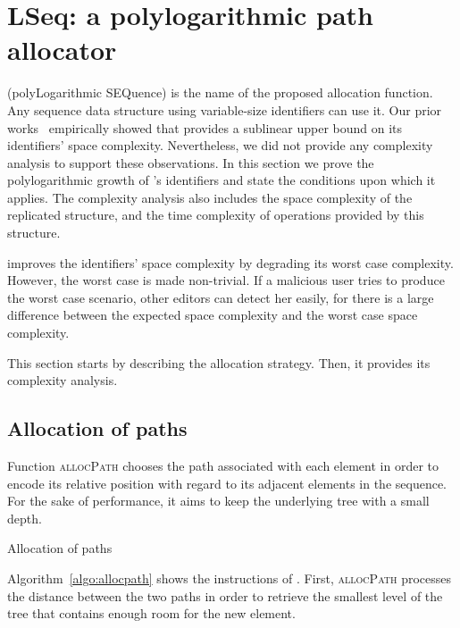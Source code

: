 

\section{LSeq: a polylogarithmic path allocator}
\label{sec:proposal}

\LSEQ (polyLogarithmic SEQuence) is the name of the proposed allocation
function. Any sequence data structure using variable-size identifiers can use
it. Our prior works~\cite{nedelec2013concurrency, nedelec2013lseq} empirically
showed that \LSEQ provides a sublinear upper bound on its identifiers' space
complexity. Nevertheless, we did not provide any complexity analysis to support
these observations. In this section we prove the polylogarithmic growth of
\LSEQ's identifiers and state the conditions upon which it applies. The
complexity analysis also includes the space complexity of the replicated
structure, and the time complexity of operations provided by this structure.

\LSEQ improves the identifiers' space complexity by degrading its worst case
complexity. However, the worst case is made non-trivial. If a malicious user
tries to produce the worst case scenario, other editors can detect her easily,
for there is a large difference between the expected space complexity and the
worst case space complexity.

This section starts by describing the allocation strategy. Then, it provides its
complexity analysis.

\subsection{Allocation of paths}
\label{subsec:lseqallocation}

Function \textsc{allocPath} chooses the path associated with each element in
order to encode its relative position with regard to its adjacent elements in
the sequence. For the sake of performance, it aims to keep the underlying tree
with a small depth.

\begin{algorithm}

\caption{\label{algo:allocpath}Allocation of paths}
\end{algorithm}

Algorithm~\ref{algo:allocpath} shows the instructions of \LSEQ. First,
\textsc{allocPath} processes the distance between the two paths in order to
retrieve the smallest level of the tree that contains enough room for the new
element.

